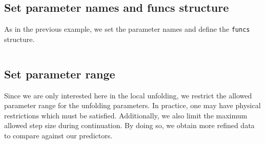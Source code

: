 \subsection{Set parameter names and funcs structure} 
\label{sm:sec:neural_network_model:pars_and_funcs}
As in the previous example, we set the parameter names and define the \texttt{funcs} structure.
\inputminted[firstline=28, lastline=39]{MATLAB}{\pathToDDEBifToolDemos/neural_network_model/neural_network_model.m}

\subsection{Set parameter range}
Since we are only interested here in the local unfolding, we restrict the
allowed parameter range for the unfolding parameters. In practice, one may have
physical restrictions which must be satisfied. Additionally, we also limit the
maximum allowed step size during continuation. By doing so, we obtain more refined
data to compare against our predictors.
\inputminted[firstline=41, lastline=44]{MATLAB}{\pathToDDEBifToolDemos/neural_network_model/neural_network_model.m}

